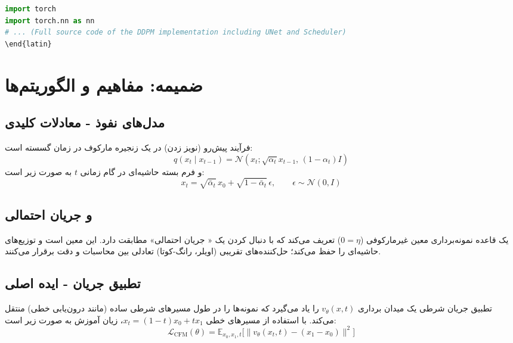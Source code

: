 \begin{latin}
\begin{lstlisting}[language=Python]
import torch
import torch.nn as nn
# ... (Full source code of the DDPM implementation including UNet and Scheduler)
\end{latin}
\end{lstlisting}



\begin{thebibliography}{9}
\end{thebibliography}

\newpage
\section{ضمیمه: مفاهیم و الگوریتم‌ها}

\subsection{مدل‌های نفوذ - معادلات کلیدی}
فرآیند پیش‌رو (نویز زدن) در  یک زنجیره مارکوف در زمان گسسته است:
\[
q(x_t\mid x_{t-1}) = \mathcal{N}(x_t;\sqrt{\alpha_t}x_{t-1},\,(1-\alpha_t)I)
\]
و فرم بسته حاشیه‌ای در گام زمانی $t$ به صورت زیر است:
\[
x_t = \sqrt{\bar{\alpha}_t}\,x_0 + \sqrt{1-\bar{\alpha}_t}\,\epsilon,\qquad \epsilon\sim\mathcal{N}(0,I)
\]



\subsection{ و  جریان احتمالی}
 یک قاعده نمونه‌برداری معین غیرمارکوفی ($0=\eta$) تعریف می‌کند که با دنبال کردن یک « جریان احتمالی» مطابقت دارد. این  معین است و توزیع‌های حاشیه‌ای را حفظ می‌کند؛ حل‌کننده‌های تقریبی (اویلر، رانگ-کوتا) تعادلی بین محاسبات و دقت برقرار می‌کنند.



\subsection{تطبیق جریان - ایده اصلی}
تطبیق جریان شرطی یک میدان برداری $v_{\theta}(x,t)$ را یاد می‌گیرد که نمونه‌ها را در طول مسیرهای شرطی ساده (مانند درون‌یابی خطی) منتقل می‌کند. با استفاده از مسیرهای خطی $x_t=(1-t)x_0+t x_1$، زیان آموزش به صورت زیر است:
\[
\mathcal{L}_{\mathrm{CFM}}(\theta)=\mathbb{E}_{x_0,x_1,t}\big[\|v_{\theta}(x_t,t)-(x_1-x_0)\|^2\big]
\]




\end{latin}
